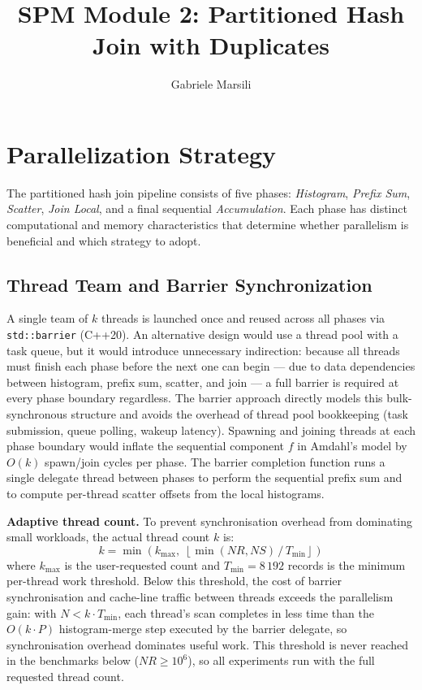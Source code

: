 \documentclass[10pt,a4paper,twocolumn]{article}
\title{\vspace{-1.5em}\textbf{SPM Module 2: Partitioned Hash Join with Duplicates}\vspace{-0.5em}}
\author{Gabriele Marsili}
\date{}
\begin{document}
\maketitle
\vspace{-1.5em}

\section{Parallelization Strategy}

The partitioned hash join pipeline consists of five phases: \textit{Histogram}, \textit{Prefix Sum}, \textit{Scatter}, \textit{Join Local}, and a final sequential \textit{Accumulation}. Each phase has distinct computational and memory characteristics that determine whether parallelism is beneficial and which strategy to adopt.

\subsection*{Thread Team and Barrier Synchronization}

A single team of $k$ threads is launched once and reused across all phases via \texttt{std::barrier} (C++20). An alternative design would use a thread pool with a task queue, but it would introduce unnecessary indirection: because all threads must finish each phase before the next one can begin --- due to data dependencies between histogram, prefix sum, scatter, and join --- a full barrier is required at every phase boundary regardless. The barrier approach directly models this bulk-synchronous structure and avoids the overhead of thread pool bookkeeping (task submission, queue polling, wakeup latency). Spawning and joining threads at each phase boundary would inflate the sequential component $f$ in Amdahl's model by $O(k)$ spawn/join cycles per phase. The barrier completion function runs a single delegate thread between phases to perform the sequential prefix sum and to compute per-thread scatter offsets from the local histograms.

\medskip\noindent\textbf{Adaptive thread count.} To prevent synchronisation overhead from dominating small workloads, the actual thread count $k$ is:
\[
  k = \min\!\left(k_{\max},\;\left\lfloor \min(NR, NS) \,/\, T_{\min} \right\rfloor\right)
\]
where $k_{\max}$ is the user-requested count and $T_{\min} = 8\,192$ records is the minimum per-thread work threshold. Below this threshold, the cost of barrier synchronisation and cache-line traffic between threads exceeds the parallelism gain: with $N < k \cdot T_{\min}$, each thread's scan completes in less time than the $O(k \cdot P)$ histogram-merge step executed by the barrier delegate, so synchronisation overhead dominates useful work. This threshold is never reached in the benchmarks below ($NR \geq 10^6$), so all experiments run with the full requested thread count.
\end{document}
